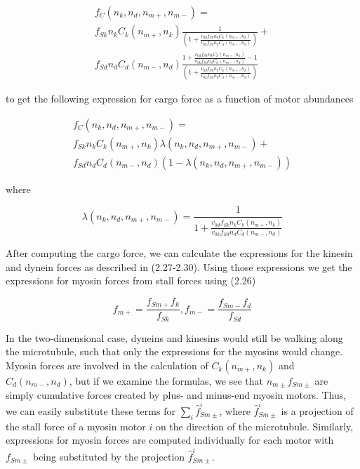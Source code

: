 \begin{equation}
\begin{split}
f_C(n_k, n_d, n_{m+}, n_{m-}) = \\
f_{Sk}n_kC_k(n_{m+}, n_k) \frac{1}{(1 + \frac{v_{0d}f_{Sk}n_kC_k(n_{m+}, n_k)}{v_{0k}f_{Sd}n_dC_d(n_{m-},n_d)})} + \\
f_{Sd}n_dC_d(n_{m-},n_d)\frac{1+\frac{v_{0d}f_{Sk}n_kC_k(n_{m+}, n_k)}{v_{0k}f_{Sd}n_dC_d(n_{m-},n_d)}-1}
{(1 + \frac{v_{0d}f_{Sk}n_kC_k(n_{m+}, n_k)}{v_{0k}f_{Sd}n_dC_d(n_{m-},n_d)})}
\end{split}
\end{equation}

to get the following expression for cargo force as a function of motor abundances

\begin{equation}
\begin{split}
f_C(n_k, n_d, n_{m+}, n_{m-}) = \\
f_{Sk}n_kC_k(n_{m+}, n_k) \lambda(n_k, n_d, n_{m+}, n_{m-}) + \\
f_{Sd}n_dC_d(n_{m-},n_d)( 1 - \lambda(n_k, n_d, n_{m+}, n_{m-}) )
\end{split}
\end{equation}

where

\begin{equation}
\lambda(n_k, n_d, n_{m+}, n_{m-}) = \frac{1}{1 + \frac{v_{0d}f_{Sk}n_kC_k(n_{m+}, n_k)}{v_{0k}f_{Sd}n_dC_d(n_{m-},n_d)}}
\end{equation}

After computing the cargo force, we can calculate the expressions for the kinesin and dynein forces as described in (2.27-2.30). Using those expressions we get the expressions for myosin forces from stall forces using (2.26)

\begin{equation}
f_{m+} = \frac{f_{Sm+}f_k}{f_{Sk}}, 
f_{m-} =  \frac{f_{Sm-}f_d}{f_{Sd}}
\end{equation}

In the two-dimensional case, dyneins and kinesins would still be walking along the microtubule, such that only the expressions for the myosins would change. Myosin forces are involved in the calculation of $C_k(n_{m+}, n_k)$ and $C_d(n_{m-},n_d)$, but if we examine the formulas, we see that $n_{m\pm}f_{Sm\pm}$ are simply cumulative forces created by plus- and minus-end myosin motors. Thus, we can easily substitute these terms for $\sum_{i}\hat{f}^i_{Sm\pm}$, where $\hat{f}^i_{Sm\pm}$ is a projection of the stall force of a myosin motor $i$ on the direction of the microtubule. Similarly, expressions for myosin forces are computed individually for each motor with $f_{Sm\pm}$ being substituted by the projection $\hat{f}^i_{Sm\pm}$.

